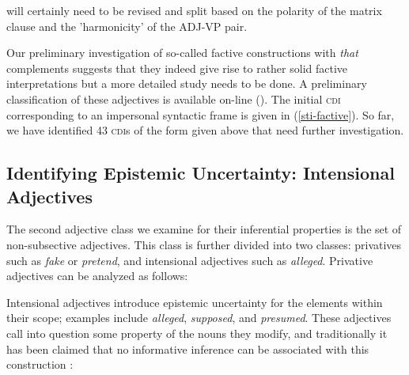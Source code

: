 \documentclass[10pt]{article}
\begin{document}
\vspace{-0.6em}
\vspace{-0.6em}
\noindent will certainly need to be revised and split based on the polarity of the matrix clause and the 'harmonicity' of the ADJ-VP pair. 

Our preliminary investigation of so-called factive constructions with \textit{that} complements suggests that 
they indeed give rise to rather solid factive interpretations but a more detailed study needs to be done.  A preliminary classification of these adjectives is available on-line (\cite{faust-adj-pol-lex}). The initial \textsc{cdi} corresponding to an impersonal syntactic frame is given in (\ref{sti-factive}).
\vspace{-0.6em}
\vspace{-0.6em}
So far, we have identified 43 \textsc{cdi}s of the form given above that need further investigation. 
\vspace{-0.5em}
 
 
\subsection{Identifying Epistemic Uncertainty: Intensional Adjectives}
\label{sec:intensional-adjectives}
\vspace {-1.5mm}

The second adjective class we examine for their inferential properties is the set of non-subsective  adjectives. 
This class is further divided into two classes: privatives such as {\it fake} or {\it pretend}, and intensional adjectives such as \emph{alleged}. 
Privative adjectives can be analyzed as follows:
\vspace{-0.5em}
\vspace{-0.5em}

\noindent
Intensional  adjectives introduce epistemic uncertainty for the elements within their scope; 
examples include \emph{alleged}, \emph{supposed}, and \emph{presumed}. These adjectives call 
into question some  property of the nouns they modify, and traditionally it has been claimed that no informative inference can be  associated with this construction \cite{Kamp95prototypetheory}:
\vspace{-.5em}
\vspace{-0.5em}
\end{document}
